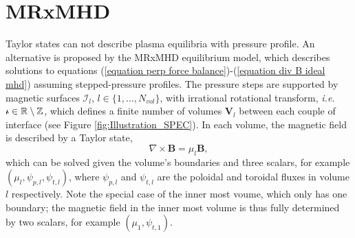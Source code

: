\documentclass[my_thesis.tex]{subfiles}
\begin{document}
\section{MRxMHD}
\label{section mrxmhd}

Taylor states can not describe plasma equilibria with pressure profile. An alternative is proposed by the MRxMHD equilibrium model, which describes solutions to equations (\ref{equation perp force balance})-(\ref{equation div B ideal mhd}) assuming stepped-pressure profiles. The pressure steps are supported by magnetic surfaces $\mathcal{I}_l$, $l\in\{1,\ldots,N_{vol}\}$, with irrational rotational transform, \textit{i.e.} $\text{$\iota\!\!$-}\in\mathbb{R}\setminus\mathbb{Z}$, which defines a finite number of volumes $\mathbf{V}_l$ between each couple of interface (see Figure \ref{fig:Illustration_SPEC}). In each volume, the magnetic field is described by a Taylor state, 
\begin{equation}
	\nabla\times\mathbf{B}=\mu_l\mathbf{B}, \label{eq.BeltramiEquation}
\end{equation}
which can be solved given the volume's boundaries and three scalars, for example $(\mu_l,\psi_{p,l},\psi_{t,l})$, where $\psi_{p,l}$ and $\psi_{t,l}$ are the poloidal and toroidal fluxes in volume $l$ respectively. Note the special case of the inner most voume, which only has one boundary; the magnetic field in the inner most volume is thus fully determined by two scalars, for example $(\mu_1,\psi_{t,1})$.
\end{document}
